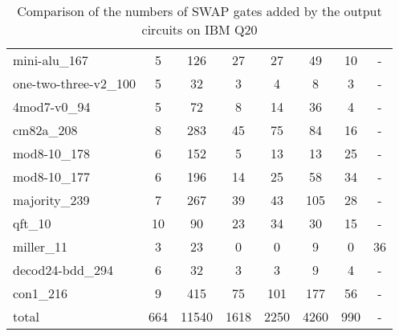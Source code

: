 \documentclass[journal]{IEEEtran}
\begin{document}
\begin{table*}[htbp]
\begin{center}
\begin{tabular}{|p{4.3cm}<{\centering}|c|c|c|c|c|c|c|}
mini-alu\_167 & 5 & 126 & 27 & 27 & 49 & 10 & - \\ 
one-two-three-v2\_100 & 5 & 32 & 3 & 4 & 8 & 3 & - \\ 
4mod7-v0\_94 & 5 & 72 & 8 & 14 & 36 & 4 & - \\ 
cm82a\_208 & 8 & 283 & 45 & 75 & 84 & 16 & - \\ 
mod8-10\_178 & 6 & 152 & 5 & 13 & 13 & 25 & - \\ 
mod8-10\_177 & 6 & 196 & 14 & 25 & 58 & 34 & - \\ 
majority\_239 & 7 & 267 & 39 & 43 & 105 & 28 & - \\ 
qft\_10 & 10 & 90 & 23 & 34 & 30 & 15 & - \\ 
miller\_11 & 3 & 23 & 0 & 0 & 9 & 0 & 36 \\ 
decod24-bdd\_294 & 6 & 32 & 3 & 3 & 9 & 4 & - \\ 
con1\_216 & 9 & 415 & 75 & 101 & 177 & 56 & - \\ 
            \hline
            total&664 & 11540 & 1618 & 2250 & 4260 & 990 &-\\
            \hline
        \end{tabular} 
        \end{center} 
        \caption{Comparison of the numbers of SWAP gates added by the 
        output circuits on IBM Q20 } 
        \label{tab4}
        \end{table*}	
\end{document}
